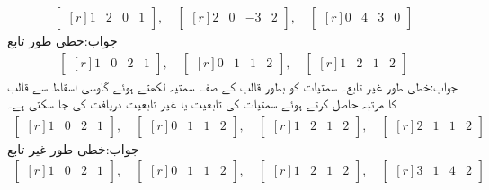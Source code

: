 \begin{align*}
\begin{bmatrix*}[r] 
1&2&0&1
\end{bmatrix*},\quad \begin{bmatrix*}[r] 
2&0&-3&2
\end{bmatrix*},\quad \begin{bmatrix*}[r] 
0&4&3&0
\end{bmatrix*}
\end{align*}
جواب:خطی طور تابع
\begin{align*}
\begin{bmatrix*}[r] 
1&0&2&1
\end{bmatrix*},\quad \begin{bmatrix*}[r] 
0&1&1&2
\end{bmatrix*},\quad \begin{bmatrix*}[r] 
1&2&1&2
\end{bmatrix*}
\end{align*}
جواب:خطی طور غیر تابع۔ سمتیات کو بطور قالب کے صف سمتیہ لکھتے ہوئے گاوسی اسقاط سے قالب کا مرتبہ حاصل کرتے ہوئے سمتیات کی تابعیت یا غیر تابعیت دریافت کی جا سکتی ہے۔
\begin{align*}
\begin{bmatrix*}[r] 
1&0&2&1
\end{bmatrix*},\quad\begin{bmatrix*}[r] 
0&1&1&2
\end{bmatrix*},\quad\begin{bmatrix*}[r] 
1&2&1&2
\end{bmatrix*},\quad\begin{bmatrix*}[r] 
2&1&1&2
\end{bmatrix*}
\end{align*}
جواب:خطی طور غیر تابع
\begin{align*}
\begin{bmatrix*}[r] 
1&0&2&1
\end{bmatrix*},\quad \begin{bmatrix*}[r] 
0&1&1&2
\end{bmatrix*},\quad \begin{bmatrix*}[r] 
1&2&1&2
\end{bmatrix*},\quad \begin{bmatrix*}[r] 
3&1&4&2
\end{bmatrix*}
\end{align*}
